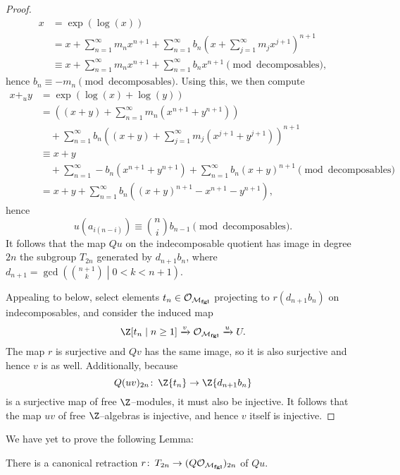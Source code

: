 \begin{proof}
\begin{align*}
x & = \exp(\log(x)) \\
& = x + \sum_{n=1}^\infty m_n x^{n+1} + \sum_{n=1}^\infty b_n \left( x + \sum_{j=1}^\infty m_j x^{j+1} \right)^{n+1} \\
& \equiv x + \sum_{n=1}^\infty m_n x^{n+1} + \sum_{n=1}^\infty b_n x^{n+1} \pmod{\text{decomposables}},
\end{align*}
hence \(b_n \equiv -m_n \pmod{\text{decomposables}}\).  Using this, we then compute
\begin{align*}
x +_u y & = \exp(\log(x) + \log(y)) \\
& = \left( (x + y) + \sum_{n=1}^\infty m_n (x^{n+1} + y^{n+1}) \right) \\
& \quad + \sum_{n=1}^\infty b_n \left( (x + y) + \sum_{j=1}^\infty m_j (x^{j+1} + y^{j+1}) \right)^{n+1} \\
& \equiv x + y \\
& \quad + \sum_{n=1}^\infty -b_n (x^{n+1} + y^{n+1}) + \sum_{n=1}^\infty b_n (x+y)^{n+1} \pmod{\text{decomposables}} \\
& = x + y + \sum_{n=1}^\infty b_n ((x+y)^{n+1} - x^{n+1} - y^{n+1}),
\end{align*}
hence \[u(a_{i(n-i)}) \equiv \binom{n}{i} b_{n-1} \pmod{\text{decomposables}}.\]  It follows that the map \(Qu\) on the indecomposable quotient has image in degree \(2n\) the subgroup \(T_{2n}\) generated by \(d_{n+1} b_n\), where \(d_{n+1} = \gcd\left( \binom{n+1}{k} \middle| 0 < k < n + 1 \right)\).

Appealing to  below, select elements \(t_n \in \mathcal{O}_{\mathcal{M}_{\mathbf{fgl}}}\) projecting to \(r(d_{n+1} b_n)\) on indecomposables, and consider the induced map \[\Z[t_n \mid n \ge 1] \xrightarrow{v} \sheaf O_{\moduli{fgl}} \xrightarrow{u} U.\]  The map \(r\) is surjective and \(Qv\) has the same image, so it is also surjective and hence \(v\) is as well.  Additionally, because \[Q(uv)_{2n}\co \Z\{t_n\} \to \Z\{d_{n+1} b_n\}\] is a surjective map of free \(\Z\)--modules, it must also be injective.  It follows that the map \(uv\) of free \(\Z\)--algebras is injective, and hence \(v\) itself is injective.
\end{proof}

We have yet to prove the following Lemma:

\begin{lemma}\label{LazardSplittingLemma}
There is a canonical retraction \(r\colon\thinspace T_{2n} \to (Q \mathcal O_{\mathcal{M}_{\mathbf{fgl}}})_{2n}\) of \(Qu\).
\end{lemma}

